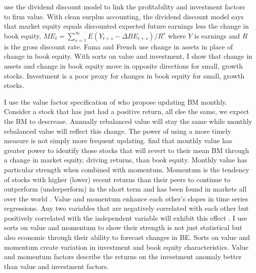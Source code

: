 \textcite{fama2006profitability} use the dividend discount model to link the
profitability and investment factors to firm value.
With clean surplus accounting, the dividend discount model says that market
equity equals discounted expected future earnings less the change in book
equity,
$ME_t = \sum_{s=1}^\infty E(Y_{t+s}-\Delta BE_{t+s})/R^s$
where $Y$ is earnings and $R$ is the gross discount rate.
Fama and French use change in assets in place of change in book equity.
With sorts on value and investment, I show that change in assets and change in
book equity move in opposite directions for small, growth stocks.
Investment is a poor proxy for changes in book equity for small, growth stocks.

I use the value factor specification of \textcite{asness2013devil} who propose
updating BM monthly.
Consider a stock that has just had a positive return, all else the same, we
expect the BM to descrease.
Annually rebalanced value will stay the same while monthly rebalanced value
will reflect this change.
The power of using a more timely measure is not simply more frequent updating.
\textcite{kok2017facts} find that monthly value has greater power to identify
those stocks that will revert to their mean BM through a change in market
equity, driving returns, than book equity.
Monthly value has particular strength when combined with momentum.
Momentum is the tendency of stocks with higher (lower) recent returns than
their peers to continue to outperform (underperform) in the short term
\parencite{jegadeesh1993returns} and has been found in markets all over
the world \parencite{asness2013value}.
Value and momentum enhance each other's slopes in time series regressions.
Any two variables that are negatively correlated with each other but positively
correlated with the independent variable will exhibit this effect
\parencite{fama2015incremental}.
I use sorts on value and momentum to show their strength is not just
statistical but also economic through their ability to forecast changes in BE.
Sorts on value and momentum create variation in investment and book equity
characteristics.
Value and momentum factors describe the returns on the investment anomaly
better than value and investment factors.

